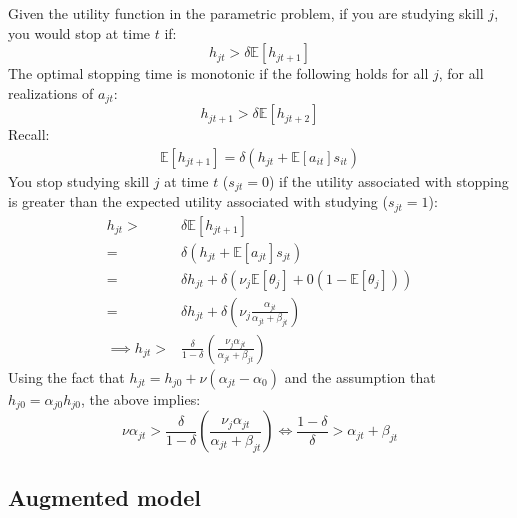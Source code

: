 \documentclass[10 pt]{article}
\newcommand{\sbr}[1]{\left[ #1 \right]}
\newcommand{\pr}[1]{\left( #1 \right)}
\begin{document}
\begin{blist}
Given the utility function in the parametric problem, if you are studying skill $j$, you would stop at time $t$ if:
\begin{equation}
h_{jt} > \delta \mathbb{E} \sbr{h_{jt+1}}
\end{equation}
The optimal stopping time is monotonic if the following holds for all $j$, for all realizations of $a_{jt}$:
\begin{equation}
h_{jt+1} > \delta \mathbb{E} \sbr{h_{jt+2}}
\end{equation}
Recall:
\begin{align*}
\mathbb{E} \sbr{h_{jt+1}} = \delta (h_{jt} + \mathbb{E} \sbr{a_{it}} s_{it})
\end{align*}
You stop studying skill $j$ at time $t$ ($s_{jt}=0$) if the utility associated with stopping is greater than the expected utility associated with studying ($s_{jt}=1$):
\begin{align*}
h_{jt} >& \delta \mathbb{E} \sbr{h_{jt+1}} \\
=& \delta (h_{jt} + \mathbb{E} \sbr{a_{jt}} s_{jt}) \\
=& \delta h_{jt} + \delta \pr{\nu_j \mathbb{E} \sbr{\theta_j} + 0 (1 - \mathbb{E} \sbr{\theta_j})} \\
=& \delta h_{jt} + \delta \pr{\nu_j \frac{\alpha_{jt}}{\alpha_{jt} + \beta_{jt}}} \\
\implies h_{jt} >& \frac{\delta}{1 - \delta} \pr{\frac{\nu_j \alpha_{jt}}{\alpha_{jt} + \beta_{jt}}}
\end{align*}
Using the fact that $h_{jt} = h_{j0} + \nu (\alpha_{jt} - \alpha_0)$ and the assumption that $h_{j0} = \alpha_{j0} h_{j0}$, the above implies:
\begin{equation*}
\nu \alpha_{jt} > \frac{\delta}{1 - \delta} \pr{\frac{\nu_j \alpha_{jt}}{\alpha_{jt} + \beta_{jt}}} \iff \frac{1-\delta}{\delta} > \alpha_{jt} + \beta_{jt}
\end{equation*} 
\end{blist}



\subsection{Augmented model}
\end{document}
